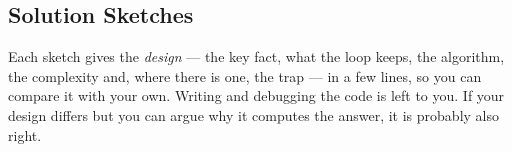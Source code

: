 \subsection{Solution Sketches}
\label{ssec:ch1-sketches}

\begin{warningbox}
Each sketch gives the \emph{design} --- the key fact, what the loop keeps, the algorithm, the complexity and, where there is one, the trap --- in a few lines, so you can compare it with your own. Writing and debugging the code is left to you. If your design differs but you can argue why it computes the answer, it is probably also right.
\end{warningbox}

\begingroup
\providecommand{\sk}{}
\renewcommand{\sk}[2]{\par\smallskip\noindent\textbf{\textcolor{deepblue}{#1}}\quad #2\par}

